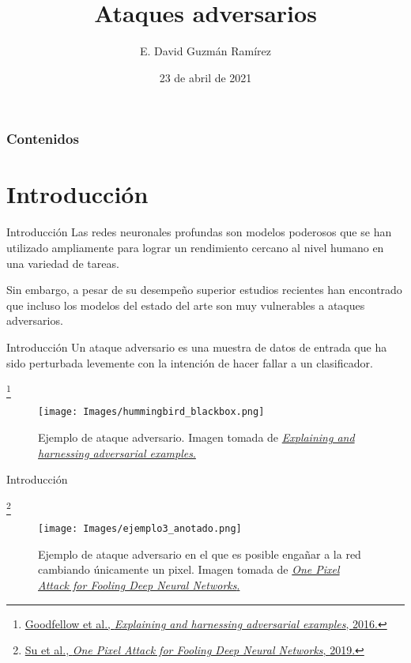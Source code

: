 \documentclass[10pt]{beamer}
\title[Ataques adversarios]{Ataques adversarios} %
\author[IIMAS, UNAM]{E. David Guzmán Ramírez} %
\institute[] %
{	Licenciatura en Ciencia de Datos \\
	Introducción al Aprendizaje Profundo \\ \medskip M. en C. Berenice Montalvo Lezama \\ M. en C. Ricardo Montalvo Lezama
}
\date{{\tiny 23 de abril de 2021}} %
\newcommand\blfootnote[1]{%
  \begingroup
  \renewcommand\thefootnote{}\footnote{#1}%
  \addtocounter{footnote}{-1}%
  \endgroup
}
\begin{document}
	
	
\begin{frame}
	\titlepage %
\end{frame}

\begin{frame}
\frametitle{Contenidos}
\justify

\tableofcontents
\end{frame}

\section{Introducción}
\begin{frame}{Introducción}
\justify
\small
Las redes neuronales profundas son modelos poderosos que se han utilizado ampliamente para lograr un rendimiento cercano al nivel humano en una variedad de tareas. \medskip

Sin embargo, a pesar de su desempeño superior estudios recientes han encontrado que incluso los modelos del estado del arte son muy vulnerables a ataques adversarios.
\end{frame}

\begin{frame}{Introducción}
\justify
\small
Un ataque adversario es una muestra de datos de entrada que ha sido perturbada levemente con la intención de hacer fallar a un clasificador. 

\blfootnote{\vspace*{0.3cm} \href{https://arxiv.org/pdf/1412.6572.pdf}{Goodfellow et al., \emph{Explaining and harnessing adversarial examples}, 2016.}}

\begin{figure}
\centering
\texttt{[image: Images/hummingbird\_blackbox.png]}
\caption{Ejemplo de ataque adversario. Imagen tomada de \href{https://arxiv.org/pdf/1412.6572.pdf}{\emph{Explaining and harnessing adversarial examples}.}}
\end{figure}

\end{frame}

\begin{frame}{Introducción}
\justify
\small

\blfootnote{\vspace*{0.3cm} \href{https://arxiv.org/pdf/1412.6572.pdf}{Su et al., \emph{One Pixel Attack for Fooling Deep Neural Networks}, 2019.}}

\begin{figure}
\centering
\texttt{[image: Images/ejemplo3\_anotado.png]}
\caption{Ejemplo de ataque adversario en el que es posible engañar a la red cambiando únicamente un pixel. Imagen tomada de \href{https://arxiv.org/pdf/1710.08864.pdf}{\emph{One Pixel Attack for Fooling Deep Neural Networks}.}}
\end{figure}

\end{frame}
\end{document}
